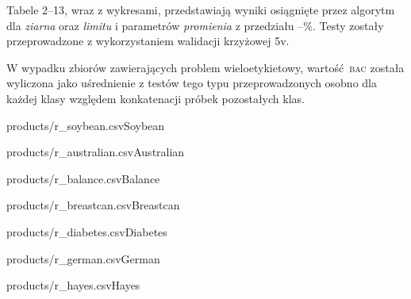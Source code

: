 \begin{table*}[!ht]
    \parbox{.65\linewidth}{
    	Tabele 2--13, wraz z wykresami, przedstawiają wyniki osiągnięte przez algorytm dla \emph{ziarna} oraz \emph{limitu}  i parametrów \emph{promienia} z przedziału --\%. Testy zostały przeprowadzone z wykorzystaniem walidacji krzyżowej \oldstylenums5v.
    	
    	W wypadku zbiorów zawierających problem wieloetykietowy, wartość \textsc{bac} została wyliczona jako uśrednienie z testów tego typu przeprowadzonych osobno dla każdej klasy względem konkatenacji próbek pozostałych klas.
	}
	\hfill
    \parbox{.32\linewidth}{
	    \begin{ride}{products/r_soybean.csv}{Soybean}\end{ride}
	}
\end{table*}

\begin{table*}[htb]
    \parbox{.32\linewidth}{
	    \begin{ride}{products/r_australian.csv}{Australian}\end{ride}
	}
	\hfill
    \parbox{.32\linewidth}{
	    \begin{ride}{products/r_balance.csv}{Balance}\end{ride}
	}
	\hfill
    \parbox{.32\linewidth}{
	    \begin{ride}{products/r_breastcan.csv}{Breastcan}\end{ride}
	}

\end{table*}


\begin{table*}[!ht]
    \parbox{.32\linewidth}{
	    \begin{ride}{products/r_diabetes.csv}{Diabetes}\end{ride}
	}
	\hfill
    \parbox{.32\linewidth}{
	    \begin{ride}{products/r_german.csv}{German}\end{ride}
	}
	\hfill
    \parbox{.32\linewidth}{
	    \begin{ride}{products/r_hayes.csv}{Hayes}\end{ride}
	}
\end{table*}


